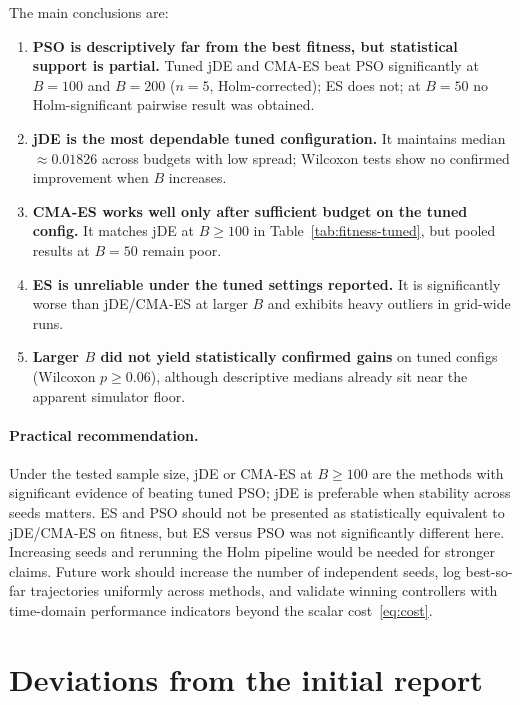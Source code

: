 \documentclass[pdflatex,sn-mathphys-num]{sn-jnl}
\begin{document}
The main conclusions are:
\begin{enumerate}
  \item \textbf{PSO is descriptively far from the best fitness, but statistical support is partial.} Tuned jDE and CMA-ES beat PSO significantly at $B=100$ and $B=200$ ($n=5$, Holm-corrected); ES does not; at $B=50$ no Holm-significant pairwise result was obtained.
  \item \textbf{jDE is the most dependable tuned configuration.} It maintains median $\approx0.01826$ across budgets with low spread; Wilcoxon tests show no confirmed improvement when $B$ increases.
  \item \textbf{CMA-ES works well only after sufficient budget on the tuned config.} It matches jDE at $B\ge100$ in Table~\ref{tab:fitness-tuned}, but pooled results at $B=50$ remain poor.
  \item \textbf{ES is unreliable under the tuned settings reported.} It is significantly worse than jDE/CMA-ES at larger $B$ and exhibits heavy outliers in grid-wide runs.
  \item \textbf{Larger $B$ did not yield statistically confirmed gains} on tuned configs (Wilcoxon $p\ge0.06$), although descriptive medians already sit near the apparent simulator floor.
\end{enumerate}

\paragraph{Practical recommendation.}
Under the tested sample size, jDE or CMA-ES at $B\ge100$ are the methods with significant evidence of beating tuned PSO; jDE is preferable when stability across seeds matters.
ES and PSO should not be presented as statistically equivalent to jDE/CMA-ES on fitness, but ES versus PSO was not significantly different here.
Increasing seeds and rerunning the Holm pipeline would be needed for stronger claims.
Future work should increase the number of independent seeds, log best-so-far trajectories uniformly across methods, and validate winning controllers with time-domain performance indicators beyond the scalar cost~\eqref{eq:cost}.

\section{Deviations from the initial report}\label{sec:deviations}
\end{document}
